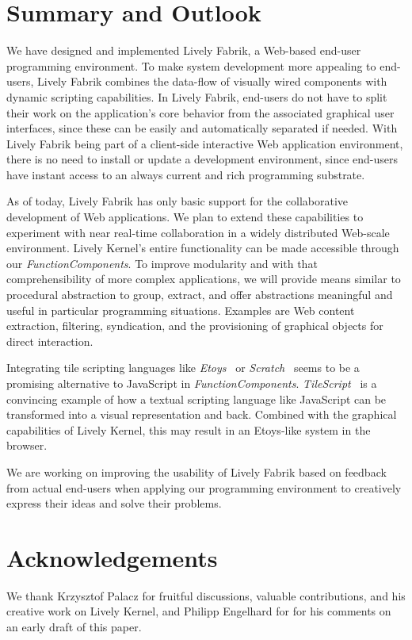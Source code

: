 \documentclass[pdftex, times, 10pt, twocolumn]{article}
\begin{document}
\section{Summary and Outlook}
We have designed and implemented Lively Fabrik, a Web-based end-user programming environment. To make system development more appealing to end-users, Lively Fabrik combines the data-flow of visually wired components with dynamic scripting capabilities. In Lively Fabrik, end-users do not have to split their work on the application's core behavior from the associated graphical user interfaces, since these can be easily and automatically separated if needed. With Lively Fabrik being part of a client-side interactive Web application environment, there is no need to install or update a development environment, since end-users have instant access to an always current and rich programming substrate. 

As of today, Lively Fabrik has only basic support for the collaborative development of Web applications. We plan to extend these capabilities to experiment with near real-time collaboration in a widely distributed Web-scale environment. Lively Kernel's entire functionality can be made accessible through our {\em FunctionComponents}. To improve modularity and with that comprehensibility of more complex applications, we will provide means similar to procedural abstraction to group, extract, and offer abstractions meaningful and useful in particular programming situations. Examples are Web content extraction, filtering, syndication, and the provisioning of graphical objects for direct interaction. 

Integrating tile scripting languages like {\em Etoys}~\cite{Kay2005SEA} or {\em Scratch}~\cite{Maloney2004SSP} seems to be a promising alternative to JavaScript in {\em FunctionComponents}. {\em TileScript}~\cite{Warth2008TMS} is a convincing example of how a textual scripting language like JavaScript can be transformed into a visual representation and back. Combined with the graphical capabilities of Lively Kernel, this may result in an Etoys-like system in the browser. 

We are working on improving the usability of Lively Fabrik based on feedback from actual end-users when applying our programming environment to creatively express their ideas and solve their problems. 



\section{Acknowledgements}
We thank Krzysztof Palacz for fruitful discussions, valuable contributions, and his creative work on Lively Kernel, and Philipp Engelhard for for his comments on an early draft of this paper.  

 



 
\end{document}
